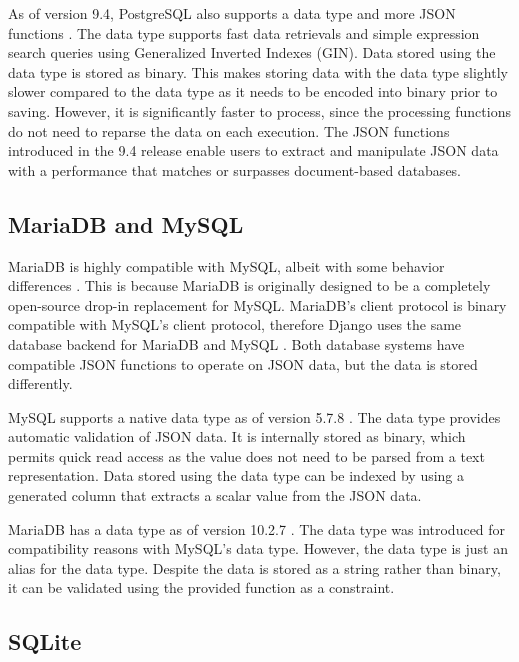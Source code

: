 As of version 9.4, PostgreSQL also supports a  data type and more
JSON functions \cite{postgresql:9.4}. The  data type supports fast
data retrievals and simple expression search queries using Generalized Inverted
Indexes (GIN). Data stored using the  data type is stored as
binary. This makes storing data with the  data type slightly slower
compared to the  data type as it needs to be encoded into binary
prior to saving. However, it is significantly faster to process, since the
processing functions do not need to reparse the data on each execution. The
JSON functions introduced in the 9.4 release enable users to extract and
manipulate JSON data with a performance that matches or surpasses
document-based databases.

\subsection{MariaDB and MySQL}

MariaDB is highly compatible with MySQL, albeit with some behavior differences
\cite{mariadb:compatibility}. This is because MariaDB is originally designed to
be a completely open-source drop-in replacement for MySQL. MariaDB's client
protocol is binary compatible with MySQL's client protocol, therefore Django
uses the same database backend for MariaDB and MySQL \cite{django:databases}.
Both database systems have compatible JSON functions to operate on JSON data,
but the data is stored differently.

MySQL supports a native  data type as of version 5.7.8
\cite{mysql:json}. The  data type provides automatic validation of
JSON data. It is internally stored as binary, which permits quick read access
as the value does not need to be parsed from a text representation. Data stored
using the  data type can be indexed by using a generated column that
extracts a scalar value from the JSON data.

MariaDB has a  data type as of version 10.2.7 \cite{mariadb:json}.
The  data type was introduced for compatibility reasons with MySQL's
 data type. However, the  data type is just an alias for
the  data type. Despite the data is stored as a string rather
than binary, it can be validated using the provided  function
as a  constraint.

\subsection{SQLite}

